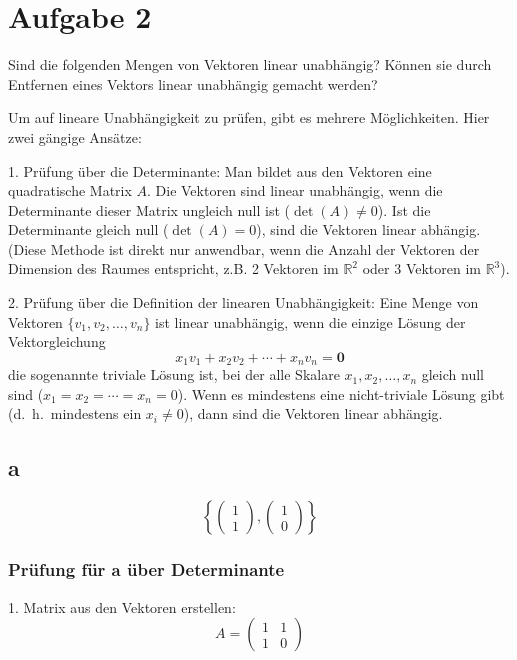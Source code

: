 \hrulefill{}

\section{Aufgabe 2}

Sind die folgenden Mengen von Vektoren linear unabhängig? Können sie durch Entfernen eines Vektors linear unabhängig gemacht werden?

Um auf lineare Unabhängigkeit zu prüfen, gibt es mehrere Möglichkeiten. Hier zwei gängige Ansätze:

1.  Prüfung über die Determinante:
    Man bildet aus den Vektoren eine quadratische Matrix $A$. Die Vektoren sind linear unabhängig, wenn die Determinante dieser Matrix 
    ungleich null ist ($\det(A) \neq 0$). Ist die Determinante gleich null ($\det(A) = 0$), sind die Vektoren linear abhängig. 
    (Diese Methode ist direkt nur anwendbar, wenn die Anzahl der Vektoren der Dimension des Raumes entspricht, z.B. 2 Vektoren im $\mathbb{R}^2$ oder 3 Vektoren im $\mathbb{R}^3$).

2.  Prüfung über die Definition der linearen Unabhängigkeit:
    Eine Menge von Vektoren $\{v_1, v_2, \dots, v_n\}$ ist linear unabhängig, wenn die einzige Lösung der Vektorgleichung
    \[ x_1v_1 + x_2v_2 + \cdots + x_n v_n = \mathbf{0} \]
    die sogenannte triviale Lösung ist, bei der alle Skalare $x_1, x_2, \dots, x_n$ gleich null sind ($x_1 = x_2 = \cdots = x_n = 0$).
    Wenn es mindestens eine nicht-triviale Lösung gibt (d.\ h.\ mindestens ein $x_i \neq 0$), dann sind die Vektoren linear abhängig.

\subsection{a}
\[ \left\{ \begin{pmatrix} 1 \\ 1 \end{pmatrix}, \begin{pmatrix} 1 \\ 0 \end{pmatrix} \right\} \]

\subsubsection*{Prüfung für a über Determinante}
1.  Matrix aus den Vektoren erstellen:
    \[ A = \begin{pmatrix} 1 & 1 \\ 1 & 0 \end{pmatrix} \]

